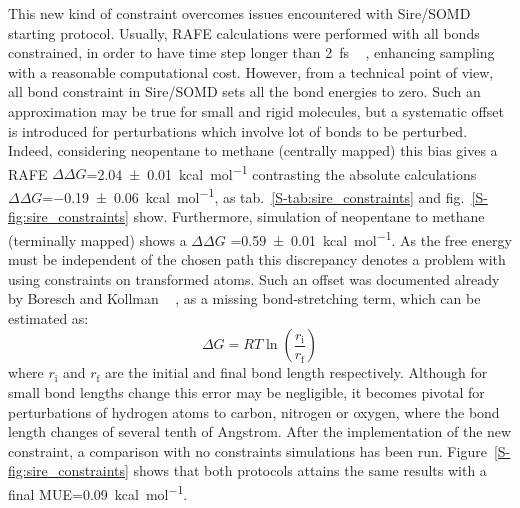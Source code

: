 \documentclass[journal=jctcce,manuscript=article]{achemso}
\begin{document}
This new kind of constraint overcomes issues encountered with Sire/SOMD starting protocol. Usually, RAFE calculations were performed with all bonds constrained, in order to have time step longer than \SI{2}{fs} ~\cite{hopkins2015long} , enhancing sampling with a reasonable computational cost.
However, from a technical point of view, all bond constraint in Sire/SOMD sets all the bond energies to zero. Such an approximation may be true for small and rigid molecules, but a systematic offset is introduced for perturbations which involve lot of bonds to be perturbed.
Indeed, considering neopentane to methane (centrally mapped) this bias gives a RAFE $\Delta\Delta G$=\SI{2.04 +- 0.01}{kcal.mol^{-1}} contrasting the absolute calculations $\Delta\Delta G$=\SI{-0.19 +- 0.06}{kcal.mol^{-1}}, as tab.~\ref{S-tab:sire_constraints} and fig.~\ref{S-fig:sire_constraints} show.
Furthermore, simulation of neopentane to methane (terminally mapped) shows a $\Delta\Delta G$ =\SI{0.59 +- 0.01}{kcal.mol^{-1}}. As the free energy must be independent of the chosen path this discrepancy denotes a problem with using constraints on transformed atoms. 
Such an offset was documented already by Boresch and Kollman ~\cite{pearlman1991overlookeds, doi:10.1021/jp981628n,doi:10.1021/jp981629f} , as a missing bond-stretching term, which can be estimated as: 
\begin{equation}
 \label{eq:allbondserror}
 \Delta G= RT\ln \left ( \frac{r_{\mathrm{i}}}{r_\mathrm{f}} \right)  
\end{equation}
where $r_{\mathrm{i}}$ and $r_{\mathrm{f}}$ are the initial and final bond length respectively. Although for small bond lengths change this error may be negligible, it becomes pivotal for perturbations of  hydrogen atoms to carbon, nitrogen or oxygen, where the bond length changes of several tenth of Angstrom.
After the implementation of the new constraint, a comparison with no constraints simulations has been run. Figure~\ref{S-fig:sire_constraints} shows that both protocols attains the same results with a final MUE=\SI{0.09}{kcal.mol^{-1}}.
\end{document}
